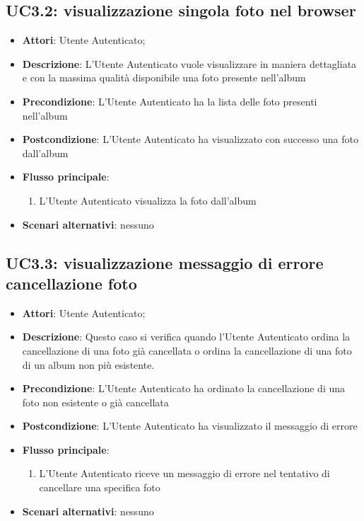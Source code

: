 
\subsection{UC3.2: visualizzazione singola foto nel browser}
\label{uc:uc3.2}

\begin{itemize}
  \item \textbf{Attori}: Utente Autenticato;
  \item \textbf{Descrizione}: L'Utente Autenticato vuole visualizzare in maniera
dettagliata e con la massima qualità disponibile una foto presente nell'album
  \item \textbf{Precondizione}: L'Utente Autenticato ha la lista delle foto
presenti nell'album
  \item \textbf{Postcondizione}: L'Utente Autenticato ha visualizzato con
successo una foto dall'album
  \item \textbf{Flusso principale}:
  \begin{enumerate}
    \item L'Utente Autenticato visualizza la foto dall'album
  \end{enumerate}
  \item \textbf{Scenari alternativi}: nessuno
\end{itemize}



\subsection{UC3.3: visualizzazione messaggio di errore cancellazione foto}
\label{uc:uc3.3}

\begin{itemize}
  \item \textbf{Attori}: Utente Autenticato;
  \item \textbf{Descrizione}: Questo caso si verifica quando l'Utente
Autenticato ordina la cancellazione di una foto già cancellata o ordina la
cancellazione di una foto di un album non più esistente.
  \item \textbf{Precondizione}: L'Utente Autenticato ha ordinato la
cancellazione di una foto non esistente o già cancellata
  \item \textbf{Postcondizione}: L'Utente Autenticato ha visualizzato il
messaggio di errore
  \item \textbf{Flusso principale}:
  \begin{enumerate}
    \item L'Utente Autenticato riceve un messaggio di errore nel tentativo di
cancellare una specifica foto
  \end{enumerate}
  \item \textbf{Scenari alternativi}: nessuno
\end{itemize}


